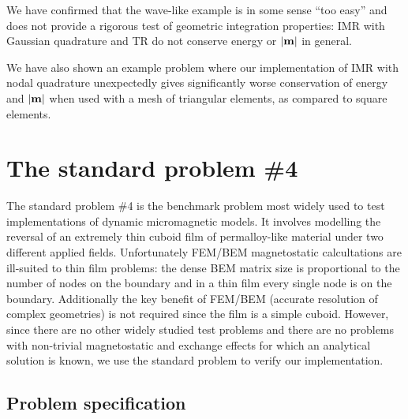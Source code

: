 We have confirmed that the wave-like example is in some sense ``too easy'' and does not provide a rigorous test of geometric integration properties: IMR with Gaussian quadrature and TR do not conserve energy or $\left|{\boldsymbol{\mathrm{m}}} \right|$ in general.

We have also shown an example problem where our implementation of IMR with nodal quadrature unexpectedly gives significantly worse conservation of energy and $\left|{\boldsymbol{\mathrm{m}}} \right|$ when used with a mesh of triangular elements, as compared to square elements.


\FloatBarrier

\section[The $\mu$mag standard problem \#4]{The \mumag standard problem \#4}
\label{sec:mumag-stand-probl}

The \mumag standard problem \#4 \cite{mumag-website} is the benchmark problem most widely used to test implementations of dynamic micromagnetic models.
It involves modelling the reversal of an extremely thin cuboid film of permalloy-like material under two different applied fields.
Unfortunately FEM/BEM magnetostatic calcultations are ill-suited to thin film problems: the dense BEM matrix size is proportional to the number of nodes on the boundary and in a thin film every single node is on the boundary.
Additionally the key benefit of FEM/BEM (accurate resolution of complex geometries) is not required since the film is a simple cuboid.
However, since there are no other widely studied test problems and there are no problems with non-trivial magnetostatic and exchange effects for which an analytical solution is known, we use the standard problem to verify our implementation.


\subsection{Problem specification}


